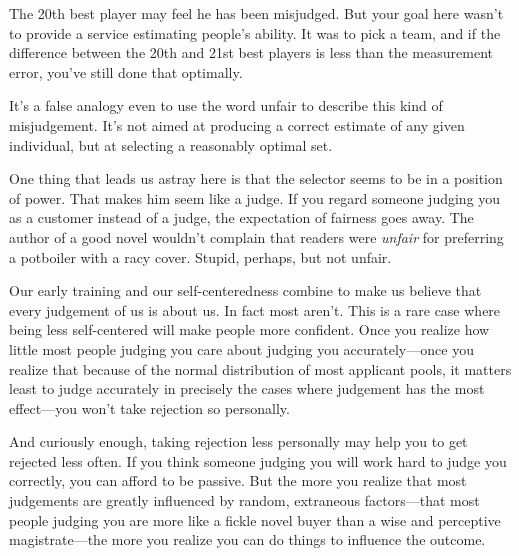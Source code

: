 The 20th best player may feel he has been
                  misjudged. But your goal here wasn't to provide a service
                  estimating people's ability. It was to pick a team, and if the
                  difference between the 20th and 21st best players is less than
                  the measurement error, you've still done that optimally.

It's
                  a false analogy even to use the word unfair to describe this
                  kind of misjudgement. It's not aimed at producing a correct
                  estimate of any given individual, but at selecting a
                  reasonably optimal set.

One thing that leads us
                  astray here is that the selector seems to be in a position of
                  power. That makes him seem like a judge. If you regard someone
                  judging you as a customer instead of a judge, the expectation
                  of fairness goes away. The author of a good novel wouldn't
                  complain that readers were \emph{unfair} for preferring a
                  potboiler with a racy cover. Stupid, perhaps, but not
                  unfair.

Our early training and our
                  self-centeredness combine to make us believe that every
                  judgement of us is about us. In fact most aren't. This is a
                  rare case where being less self-centered will make people more
                  confident. Once you realize how little most people judging you
                  care about judging you accurately---once you realize that
                  because of the normal distribution of most applicant pools, it
                  matters least to judge accurately in precisely the cases where
                  judgement has the most effect---you won't take rejection
                  so personally.

And curiously enough, taking
                  rejection less personally may help you to get rejected less
                  often. If you think someone judging you will work hard to
                  judge you correctly, you can afford to be passive. But the
                  more you realize that most judgements are greatly influenced
                  by random, extraneous factors---that most people judging
                  you are more like a fickle novel buyer than a wise and
                  perceptive magistrate---the more you realize you can do
                  things to influence the outcome.


